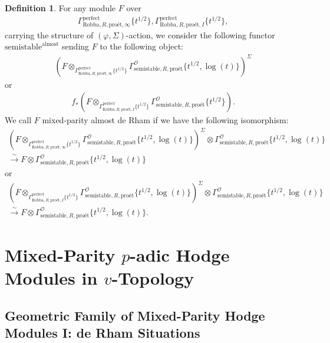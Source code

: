 \documentclass[12pt]{book}
\theoremstyle{definition}
\newtheorem{definition}{Definition}
\begin{document}
\begin{definition}
For any module $F$ over 
\begin{align}
\Gamma^\mathrm{perfect}_{\text{Robba},R,\text{pro\'et},\infty}\{t^{1/2}\},\Gamma^\mathrm{perfect}_{\text{Robba},R,\text{pro\'et},I}\{t^{1/2}\},
\end{align} 
carrying the structure of $(\varphi,\Sigma)$-action, we consider the following functor $\mathrm{semistable}^\mathrm{almost}$ sending $F$ to the following object:
\begin{align}
(F\otimes_{\Gamma^\mathrm{perfect}_{\text{Robba},R,\text{pro\'et},\infty}\{t^{1/2}\}} \Gamma^\mathcal{O}_{\text{semistable},R,\text{pro\'et}}\{t^{1/2},\log(t)\})^\Sigma
\end{align}
or 
\begin{align}
f_*(F\otimes_{\Gamma^\mathrm{perfect}_{\text{Robba},R,\text{pro\'et},I}\{t^{1/2}\}} \Gamma^\mathcal{O}_{\text{semistable},R,\text{pro\'et}}\{t^{1/2}\}).
\end{align}
We call $F$ mixed-parity almost de Rham if we have the following isomorphism:
\begin{align}
(F\otimes_{\Gamma^\mathrm{perfect}_{\text{Robba},R,\text{pro\'et},\infty}\{t^{1/2}\}} \Gamma^\mathcal{O}_{\text{semistable},R,\text{pro\'et}}\{t^{1/2},\log(t)\})^\Sigma \otimes \Gamma^\mathcal{O}_{\text{semistable},R,\text{pro\'et}}\{t^{1/2},\log(t)\} \\
\overset{\sim}{\longrightarrow} F \otimes \Gamma^\mathcal{O}_{\text{semistable},R,\text{pro\'et}}\{t^{1/2},\log(t)\} 
\end{align}
or 
\begin{align}
(F\otimes_{\Gamma^\mathrm{perfect}_{\text{Robba},R,\text{pro\'et},I}\{t^{1/2}\}} \Gamma^\mathcal{O}_{\text{semistable},R,\text{pro\'et}}\{t^{1/2},\log(t)\})^\Sigma \otimes \Gamma^\mathcal{O}_{\text{semistable},R,\text{pro\'et}}\{t^{1/2},\log(t)\}\\ \overset{\sim}{\longrightarrow} F \otimes \Gamma^\mathcal{O}_{\text{semistable},R,\text{pro\'et}}\{t^{1/2},\log(t)\}. 
\end{align}
\end{definition}



\chapter{Mixed-Parity $p$-adic Hodge Modules in $v$-Topology}


\newpage
\section{Geometric Family of Mixed-Parity Hodge Modules I: de Rham Situations}
\end{document}
